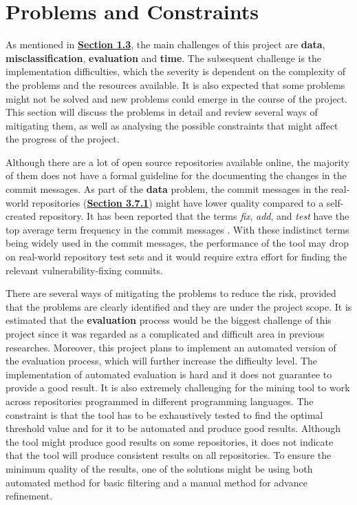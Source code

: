 \documentclass[12pt, a4paper]{report}
\begin{document}
\section{Problems and Constraints} \label{sec:problems_and_constraints}
As mentioned in \hyperref[sec:challenges]{\textbf{Section 1.3}}, the main challenges of this project
are \textbf{data}, \textbf{misclassification}, \textbf{evaluation} and \textbf{time}. The subsequent
challenge is the implementation difficulties, which the severity is dependent on the complexity of
the problems and the resources available. It is also expected that some problems might not be solved
and new problems could emerge in the course of the project. This section will discuss the problems
in detail and review several ways of mitigating them, as well as analysing the possible constraints
that might affect the progress of the project.

Although there are a lot of open source repositories available online, the majority of them does not
have a formal guideline for the documenting the changes in the commit messages. As part of the
\textbf{data} problem, the commit messages in the real-world repositories
(\hyperref[sec:realworld]{\textbf{Section 3.7.1}}) might have lower quality compared to a
self-created repository. It has been reported that the terms \textit{fix}, \textit{add}, and
\textit{test} have the top average term frequency in the commit messages \cite{alali_2008}. With
these indistinct terms being widely used in the commit messages, the performance of the tool may
drop on real-world repository test sets and it would require extra effort for finding the relevant
vulnerability-fixing commits.

There are several ways of mitigating the problems to reduce the risk, provided that the problems are
clearly identified and they are under the project scope. It is estimated that the
\textbf{evaluation} process would be the biggest challenge of this project since it was regarded as
a complicated and difficult area in previous researches. Moreover, this project plans to implement
an automated version of the evaluation process, which will further increase the difficulty level.
The implementation of automated evaluation is hard and it does not guarantee to provide a good
result. It is also extremely challenging for the mining tool to work across repositories programmed
in different programming languages. The constraint is that the tool has to be exhaustively tested to
find the optimal threshold value and for it to be automated and produce good results. Although the
tool might produce good results on some repositories, it does not indicate that the tool will
produce consistent results on all repositories. To ensure the minimum quality of the results, one of
the solutions might be using both automated method for basic filtering and a manual method for
advance refinement.
\end{document}

